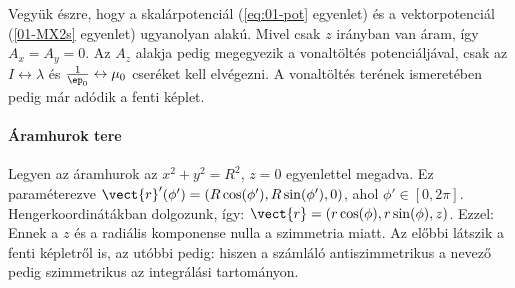     Vegyük észre, hogy a skalárpotenciál (\eqref{eq:01-pot} egyenlet) és a vektorpotenciál (\eqref{01-MX2s} egyenlet) ugyanolyan alakú.
   Mivel csak $z$ irányban van áram, így $A_x=A_y=0$.
   Az $A_z$ alakja pedig megegyezik a vonaltöltés potenciáljával, csak az $I\leftrightarrow \lambda$ és $\frac{1}{\ep_0}\leftrightarrow\mu_0$ cseréket kell elvégezni.
   A vonaltöltés terének ismeretében pedig már adódik a fenti képlet.
    
   \paragraph{Áramhurok tere}
    
    Legyen az áramhurok az $x^2+y^2=R^2$, $z=0$ egyenlettel megadva.
   Ez paraméterezve $\vect{r}'(\phi')=(R\cos(\phi'),R\sin(\phi'),0)$, ahol $\phi'\in[0,2\pi]$.
   Hengerkoordinátákban dolgozunk, így: $\vect{r}=(r\cos(\phi),r\sin(\phi),z)$.
   Ezzel:
    Ennek a $z$ és a radiális komponense nulla a szimmetria miatt.
   Az előbbi látszik a fenti képletről is, az utóbbi pedig:
    hiszen a számláló antiszimmetrikus a nevező pedig szimmetrikus az integrálási tartományon.
    
